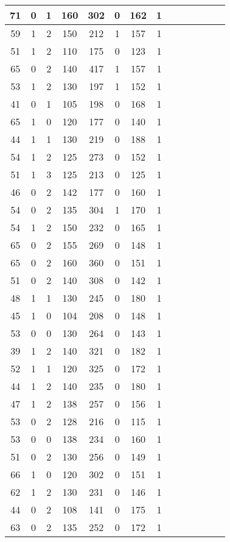 \documentclass{article}
\begin{document}
\begin{center}
\begin{longtable}{|c|c|c|c|c|c|c|c|c|c|c|c|c|c|}
\hline
71 & 0 & 1 & 160 & 302 & 0 & 162 & 1 \\
\hline
59 & 1 & 2 & 150 & 212 & 1 & 157 & 1 \\
\hline
51 & 1 & 2 & 110 & 175 & 0 & 123 & 1 \\
\hline
65 & 0 & 2 & 140 & 417 & 1 & 157 & 1 \\
\hline
53 & 1 & 2 & 130 & 197 & 1 & 152 & 1 \\
\hline
41 & 0 & 1 & 105 & 198 & 0 & 168 & 1 \\
\hline
65 & 1 & 0 & 120 & 177 & 0 & 140 & 1 \\
\hline
44 & 1 & 1 & 130 & 219 & 0 & 188 & 1 \\
\hline
54 & 1 & 2 & 125 & 273 & 0 & 152 & 1 \\
\hline
51 & 1 & 3 & 125 & 213 & 0 & 125 & 1 \\
\hline
46 & 0 & 2 & 142 & 177 & 0 & 160 & 1 \\
\hline
54 & 0 & 2 & 135 & 304 & 1 & 170 & 1 \\
\hline
54 & 1 & 2 & 150 & 232 & 0 & 165 & 1 \\
\hline
65 & 0 & 2 & 155 & 269 & 0 & 148 & 1 \\
\hline
65 & 0 & 2 & 160 & 360 & 0 & 151 & 1 \\
\hline
51 & 0 & 2 & 140 & 308 & 0 & 142 & 1 \\
\hline
48 & 1 & 1 & 130 & 245 & 0 & 180 & 1 \\
\hline
45 & 1 & 0 & 104 & 208 & 0 & 148 & 1 \\
\hline
53 & 0 & 0 & 130 & 264 & 0 & 143 & 1 \\
\hline
39 & 1 & 2 & 140 & 321 & 0 & 182 & 1 \\
\hline
52 & 1 & 1 & 120 & 325 & 0 & 172 & 1 \\
\hline
44 & 1 & 2 & 140 & 235 & 0 & 180 & 1 \\
\hline
47 & 1 & 2 & 138 & 257 & 0 & 156 & 1 \\
\hline
53 & 0 & 2 & 128 & 216 & 0 & 115 & 1 \\
\hline
53 & 0 & 0 & 138 & 234 & 0 & 160 & 1 \\
\hline
51 & 0 & 2 & 130 & 256 & 0 & 149 & 1 \\
\hline
66 & 1 & 0 & 120 & 302 & 0 & 151 & 1 \\
\hline
62 & 1 & 2 & 130 & 231 & 0 & 146 & 1 \\
\hline
44 & 0 & 2 & 108 & 141 & 0 & 175 & 1 \\
\hline
63 & 0 & 2 & 135 & 252 & 0 & 172 & 1 \\

\end{longtable}
\end{center}
\end{document}
